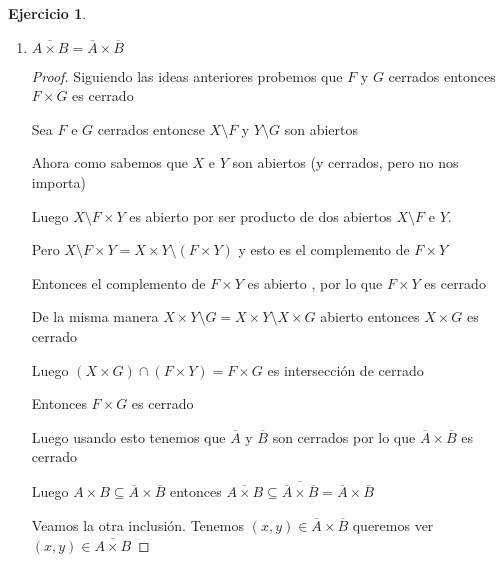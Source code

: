 \documentclass[12pt]{report}
\newcommand{\ol}{\overline}
\newcommand{\open}{\mathrm{o}}
\theoremstyle{definition}
\newtheorem{ej}{Ejercicio}
\begin{document}
\begin{ej}
\begin{enumerate}
\begin{proof}
	Veamos $A^{\open} \times B^{\open} \supseteq (A \times B)^{\open}$

	Sea $(x,y) \in (A \times B)^{\open}$ entonces existe $r>0 \quad B_{r}(x,y) \subseteq (A \times B)$

	Entonces si $x' \in B(x,\frac{r}{2})$ e $y' \in B(y,\frac{r}{2})$

	Luego $d((x',y')(x,y)) = d_{1}(x',x) + d_{2}(y',y) < \frac{r}{2} + \frac{r}{2} = r$

	entonces $(x',y') \in B_{r}(x,y) \subseteq A \times B$

	Luego $x' \in A$ y tambien $y' \in B$

	Por lo tanto $B(x,\frac{r}{2}) \subseteq A$ y por otro lado $B(y,\frac{r}{2}) \subseteq B$

	Entonces $x \in A^{\open}$ e $y \in B^{\open}$ luego $(x,y) \in A^{\open} \times B^{\open}$  
      \end{proof}
    \item $\ol{A\times B} = \ol{A} \times \ol{B}$
      \begin{proof}
	Siguiendo las ideas anteriores probemos que $F$ y $G$ cerrados entonces $F \times G$ es cerrado

	Sea $F$ e $ G$ cerrados entoncse $X \setminus F$ y $Y \setminus G$ son abiertos 

	Ahora como sabemos que $X$ e $Y$ son abiertos (y cerrados, pero no nos importa)

	Luego $X\setminus F \times Y  $ es abierto por ser producto de dos abiertos $X\setminus F$ e $Y$.

	Pero $ X\setminus F \times Y = X \times Y \setminus (F \times Y) $ y esto es el complemento de $F \times Y$

	Entonces el complemento de $F \times Y$ es abierto , por lo que $F \times Y$ es cerrado

	De la misma manera $X \times Y \setminus G = X \times Y \setminus X \times G$ abierto entonces $X \times G$ es cerrado

	Luego $(X \times G )\cap (F \times Y) = F\times G$ es intersección de cerrado

	Entonces $F \times G$ es cerrado

	Luego usando esto tenemos que $\ol A$ y $\ol B$ son cerrados por lo que $\ol A \times \ol B$ es cerrado

	Luego $A \times B \subseteq \ol A \times \ol B$ entonces $\ol{A \times B} \subseteq \ol{\ol A \times \ol B} = \ol A \times \ol B$

	Veamos la otra inclusión. Tenemos $(x,y) \in \ol A \times \ol B$ queremos ver $(x,y) \in \ol{A \times B}$


\end{proof}
\end{enumerate}
\end{ej}
\end{document}
